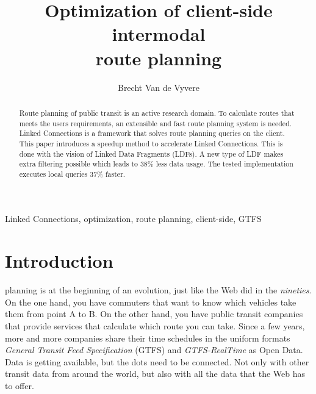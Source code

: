 \documentclass[twocolumn]{phdsymp} %
\begin{document}
\title{Optimization of client-side intermodal \\route planning} %

\author{Brecht Van de Vyvere}


\maketitle

   
\begin{abstract}
Route planning of public transit is an active research domain. To calculate routes that meets the users requirements, an extensible and fast route planning system is needed. Linked Connections is a framework that solves route planning queries on the client. This paper introduces a speedup method to accelerate Linked Connections. This is done with the vision of Linked Data Fragments (LDFs). A new type of LDF makes extra filtering possible which leads to 38\% less data usage. The tested implementation executes local queries 37\% faster.
\end{abstract}

\begin{keywords}
Linked Connections, optimization, route planning, client-side, GTFS
\end{keywords}

\section{Introduction}
 planning is at the beginning of an evolution, just like the Web did in the \textit{nineties}. On the one hand, you have commuters that want to know which vehicles take them from point A to B. On the other hand, you have public transit companies that provide services that calculate which route you can take. Since a few years, more and more companies share their time schedules in the uniform formats \textit{General Transit Feed Specification} (GTFS) and \textit{GTFS-RealTime} as Open Data. Data is getting available, but the dots need to be connected. Not only with other transit data from around the world, but also with all the data that the Web has to offer.
\end{document}
